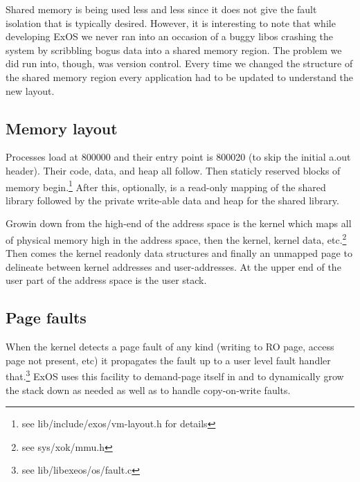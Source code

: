 Shared memory is being used less and less since it does not give the
fault isolation that is typically desired. However, it is interesting
to note that while developing ExOS we never ran into an occasion of a
buggy libos crashing the system by scribbling bogus data into a shared
memory region. The problem we did run into, though, was version
control.  Every time we changed the structure of the shared memory
region every application had to be updated to understand the new
layout.

\subsection {Memory layout}

Processes load at 800000 and their entry point is 800020 (to skip the
initial a.out header). Their code, data, and heap all follow. Then
staticly reserved blocks of memory begin.\footnote{see
lib/include/exos/vm-layout.h for details} After this, optionally, is a
read-only mapping of the shared library followed by the private
write-able data and heap for the shared library.

Growin down from the high-end of the address space is the kernel which
maps all of physical memory high in the address space, then the
kernel, kernel data, etc.\footnote{see sys/xok/mmu.h} Then comes the
kernel readonly data structures and finally an unmapped page to
delineate between kernel addresses and user-addresses. At the upper
end of the user part of the address space is the user stack.

\subsection {Page faults}

When the kernel detects a page fault of any kind (writing to RO page,
access page not present, etc) it propagates the fault up to a user
level fault handler that.\footnote {see lib/libexeos/os/fault.c} ExOS
uses this facility to demand-page itself in and to dynamically grow
the stack down as needed as well as to handle copy-on-write faults.
